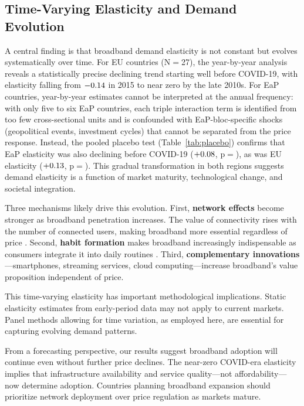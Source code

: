 \subsection{Time-Varying Elasticity and Demand Evolution}

A central finding is that broadband demand elasticity is not constant but evolves systematically over time. For EU countries (N$=$27), the year-by-year analysis reveals a statistically precise declining trend starting well before COVID-19, with elasticity falling from $-0.14$ in 2015 to near zero by the late 2010s. For EaP countries, year-by-year estimates cannot be interpreted at the annual frequency: with only five to six EaP countries, each triple interaction term is identified from too few cross-sectional units and is confounded with EaP-bloc-specific shocks (geopolitical events, investment cycles) that cannot be separated from the price response. Instead, the pooled placebo test (Table~\ref{tab:placebo}) confirms that EaP elasticity was also declining before COVID-19 ($+0.08$, p$=$\PlaceboEaPPval), as was EU elasticity ($+0.13$, p$=$\PlaceboEUPval). This gradual transformation in both regions suggests demand elasticity is a function of market maturity, technological change, and societal integration.

Three mechanisms likely drive this evolution. First, \textbf{network effects} become stronger as broadband penetration increases. The value of connectivity rises with the number of connected users, making broadband more essential regardless of price \citep{katz1985network}. Second, \textbf{habit formation} makes broadband increasingly indispensable as consumers integrate it into daily routines \citep{becker1988theory}. Third, \textbf{complementary innovations}---smartphones, streaming services, cloud computing---increase broadband's value proposition independent of price.

This time-varying elasticity has important methodological implications. Static elasticity estimates from early-period data may not apply to current markets. Panel methods allowing for time variation, as employed here, are essential for capturing evolving demand patterns.

From a forecasting perspective, our results suggest broadband adoption will continue even without further price declines. The near-zero COVID-era elasticity implies that infrastructure availability and service quality---not affordability---now determine adoption. Countries planning broadband expansion should prioritize network deployment over price regulation as markets mature.

